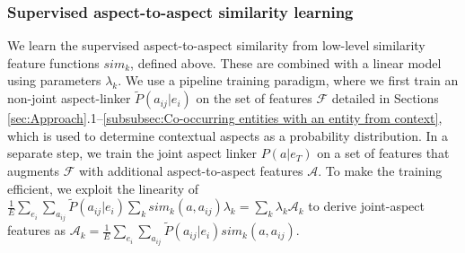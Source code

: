 \subsubsection{Supervised aspect-to-aspect similarity learning}
We learn the supervised aspect-to-aspect similarity from low-level similarity feature functions $sim_k$, defined above. These are combined with a linear model using parameters $\lambda_k$. We use a pipeline training  paradigm, where we first train an non-joint aspect-linker $\tilde{P}(a_{ij} \vert e_i)$ on the set of features $\mathcal{F}$ detailed in Sections  \ref{sec:Approach}.1--\ref{subsubsec:Co-occurring entities with an entity from context}, which is used to determine contextual aspects as a probability distribution. In a separate step, we train the joint aspect linker $P(a \vert e_T)$ on a set of features that augments $\mathcal{F}$ with additional aspect-to-aspect features $\mathcal{A}$. To make the training efficient, we exploit the linearity of $\frac{1}{E}\sum_{e_i} \sum_{a_{ij}} \tilde{P}(a_{ij}|e_i) \sum_k sim_k(a,a_{ij}) \lambda_k = \sum_k \lambda_k \mathcal{A}_k$ to derive joint-aspect features as $\mathcal{A}_k=\frac{1}{E}\sum_{e_i} \sum_{a_{ij}} \tilde{P}(a_{ij}|e_i) sim_k(a,a_{ij})$.





\begin{comment}
We give a brief overview of the same again for reference. 

Nanni et al.\cite{nanni2018entity} consider three types of aspect representations for finding its similarity to the entity mention in context. 

\textbf{Header.} Rank aspects based on similarity of the mention in context to the header of each section in the Wikipedia page.

\textbf{Content.} Rank aspects based on the similarity between the mention in context and the content of each section of the Wikipedia page of the entity.

\textbf{Entity.} Overlap of entities mentioned in the context of the entity mention and the content of a section on the Wikipedia page of the entity.

They use the following features to rank aspects using the representations above.

\textbf{TF-IDF.} Cosine similarity between the TF-IDF (logarithmic, L2-normalized) vector of contextual mention and aspect.

\textbf{BM25.} Rank aspect representations using the contextual mention as a query using BM25 ($k_1=2, b=0.75)$.

\textbf{Word Embeddings.} Cosine similarity between the mention in context and
the aspect using pre-trained GloVe \cite{pennington2014glove} embeddings of dimension 300. 

\textbf{Entity Embeddings.} Use 500 dimensional RDF2Vec \cite{ristoski2016rdf2vec} embeddings to embed entities in the context of the entity mention and a section from the Wikipedia page of the entity, then compute
the document vector using the TF-IDF of an an entity in context of the entity mention and its embedding.
\end{comment}
